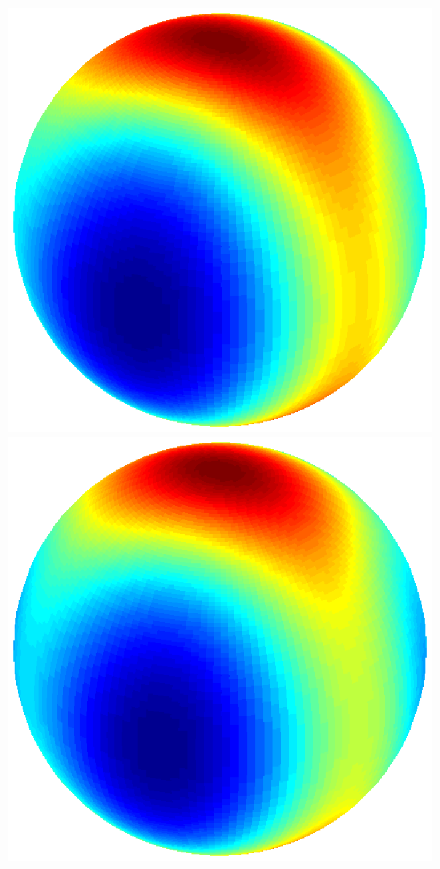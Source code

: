 \documentclass[dvips,aoas,preprint]{imsart}
\numberwithin{equation}{section}
\theoremstyle{plain}
\begin{document}
\begin{figure}[!htbp]
\begin{minipage}[]{0.12\textwidth}
    \end{minipage}
    \begin{minipage}[]{0.12\textwidth}
      \centering
      \includegraphics*[width=\textwidth]{figure2h1.eps}
    \end{minipage}
    \begin{minipage}[]{0.12\textwidth}
      \centering
      \includegraphics*[width=\textwidth]{figure2i1.eps}

\end{minipage}
\end{figure}
\end{document}
